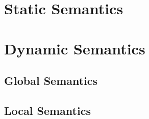 \documentclass[9pt]{article}
\begin{document}
\section{Static Semantics}



\section{Dynamic Semantics}



\subsection{Global Semantics}



\subsection{Local Semantics}


\end{document}
